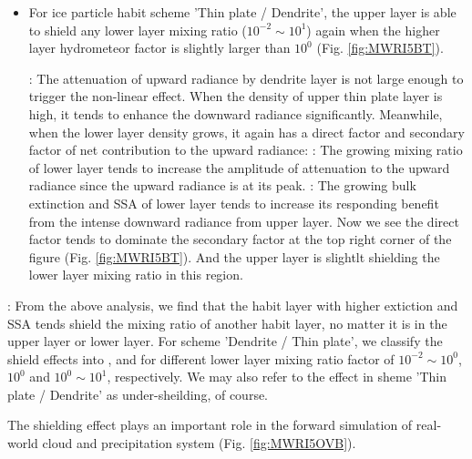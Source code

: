 \begin{itemize}
    \item {}
    For ice particle habit scheme 'Thin plate / Dendrite', the upper layer is able to shield any lower layer mixing ratio ($10^{-2} \sim 10^{1}$) again 
when the higher layer hydrometeor factor is slightly larger than $10^{0}$ (Fig. \ref{fig:MWRI5BT}).

    :
    The attenuation of upward radiance by dendrite layer is not large enough to trigger the non-linear effect.  
When the density of upper thin plate layer is high, it tends to enhance the downward radiance significantly.
Meanwhile, when the lower layer density grows, it again has a direct factor and secondary factor of net contribution to the upward radiance:
    : The growing mixing ratio of lower layer tends to increase the amplitude of attenuation to the upward radiance since the upward radiance 
is at its peak.
    : The growing bulk extinction and SSA of lower layer tends to increase its responding benefit from the intense downward radiance from upper layer.
    Now we see the direct factor tends to dominate the secondary factor at the top right corner of the figure (Fig. \ref{fig:MWRI5BT}). 
And the upper layer is slightlt shielding the lower layer mixing ratio in this region.
\end{itemize}

: From the above analysis, we find that the habit layer with higher extiction and SSA tends shield the mixing ratio of another habit layer, no matter
it is in the upper layer or lower layer. 
    For scheme 'Dendrite / Thin plate', we classify the shield effects into ,  and  for different
lower layer mixing ratio factor of $10^{-2} \sim 10^{0}$, $10^{0}$ and $10^{0} \sim 10^{1}$, respectively. We may also refer to the effect in sheme 'Thin plate / Dendrite'
as under-sheilding, of course.

    The shielding effect plays an important role in the forward simulation of real-world cloud and precipitation system (Fig. \ref{fig:MWRI5OVB}).

